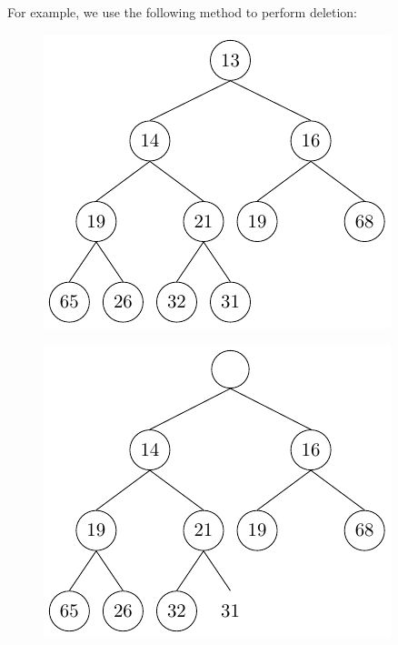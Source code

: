 For example, we use the following method to perform deletion:
\begin{center}
\begin{minipage}{0.32\textwidth}
\begin{figure}[H]
  \centering
  \includegraphics[width=\textwidth]{Figure/HeapD1.pdf}
\end{figure}
\end{minipage}
\begin{minipage}{0.32\textwidth}
\begin{figure}[H]
  \centering
  \includegraphics[width=\textwidth]{Figure/HeapD2.pdf}

\end{figure}
\end{minipage}
\end{center}
